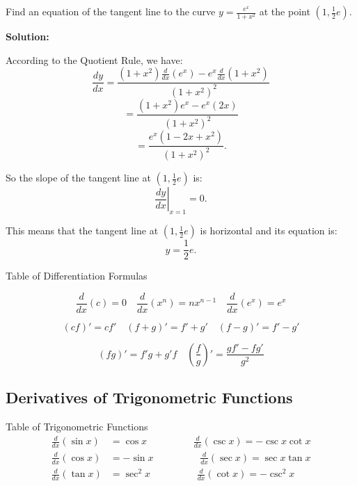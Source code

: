 \documentclass[12pt]{article}
\theoremstyle{beautifulthm}
\begin{document}
\begin{tcolorbox}[colback=examplebg, colframe=red!75!black, title=\textbf{EXAMPLE 2: Using the Quotient Rule}, fonttitle=\bfseries, sharp corners]

Find an equation of the tangent line to the curve \( y = \frac{e^x}{1 + x^2} \) at the point \( \left(1, \frac{1}{2}e\right) \).

\tcblower
\textbf{Solution:}

According to the Quotient Rule, we have:
\[
\frac{dy}{dx} = \frac{(1 + x^2) \frac{d}{dx}(e^x) - e^x \frac{d}{dx}(1 + x^2)}{(1 + x^2)^2}
\]
\[
= \frac{(1 + x^2)e^x - e^x(2x)}{(1 + x^2)^2}
\]
\[
= \frac{e^x(1 - 2x + x^2)}{(1 + x^2)^2}.
\]

So the slope of the tangent line at \( \left(1, \frac{1}{2}e\right) \) is:
\[
\left. \frac{dy}{dx} \right|_{x=1} = 0.
\]

This means that the tangent line at \( \left(1, \frac{1}{2}e\right) \) is horizontal and its equation is:
\[
y = \frac{1}{2}e.
\]

\end{tcolorbox}




\begin{Note}{Table of Differentiation Formulas}{}

\[
\frac{d}{dx}(c) = 0 \quad \frac{d}{dx}(x^n) = nx^{n-1} \quad \frac{d}{dx}(e^x) = e^x
\]


\[
(cf)' = cf' \quad (f+g)' = f' + g' \quad (f-g)' = f' - g'
\]


\[
(fg)' = f'g + g'f \quad \left( \frac{f}{g} \right)' = \frac{gf' - fg'}{g^2}
\]

\end{Note}


\newpage
\subsection{Derivatives of Trigonometric Functions}

\setlength{\tabcolsep}{1em}

\begin{Note}{Table of  Trigonometric Functions}{}
\[
\begin{aligned}
    \frac{d}{dx}(\sin x) & = \cos x \hspace{2cm} \frac{d}{dx}(\csc x) = -\csc x \cot x \\
    \frac{d}{dx}(\cos x) & = -\sin x \hspace{2cm} \frac{d}{dx}(\sec x) = \sec x \tan x \\
    \frac{d}{dx}(\tan x) & = \sec^2 x \hspace{2cm} \frac{d}{dx}(\cot x) = -\csc^2 x
\end{aligned}
\]
\end{Note}
\end{document}
